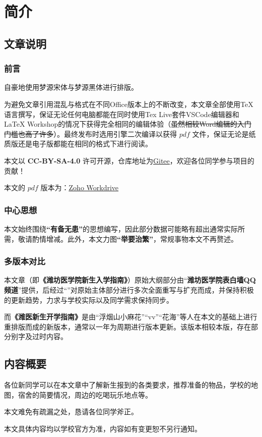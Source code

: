 \chapter[简介]{简介\vspace{-2em}}
\section[文章说明]{文章说明}
\vspace{-1em}
\subsection[前言]{前言}
\vspace{-1em}
自豪地使用梦源宋体与梦源黑体进行排版。

为避免文章引用混乱与格式在不同Office版本上的不断改变，本文章全部使用\TeX 语言撰写，保证无论任何电脑都能在同时使用Tex Live套件VSCode编辑器和LaTeX Workshop的情况下获得完全相同的编辑体验（\sout{虽然相较Word编辑的入门门槛也高了许多}）。最终发布时选用\XeLaTeX 引擎二次编译以获得 $pdf$ 文件，保证无论是纸质版还是电子版都能在相同的格式下进行阅读。

本文以 \textbf{CC-BY-SA-4.0} 许可开源，仓库地址为\uline{\href{https://gitee.com/mikazo/guide_for_freshman}{Gitee}}，欢迎各位同学参与项目的贡献！

本文的 $pdf$ 版本\textbf{}为：\uline{\href{https://workdrive.zohoexternal.com/folder/sx5ijbbd2ad4d669c4c358d59fe314410aaf4}{Zoho Workdrive}}

\subsection[中心思想]{中心思想}
\vspace{-1em}
本文始终围绕\textbf{“有备无患”}的思想编写，因此部分数据可能略有超出通常实际所需，敬请酌情增减。此外，本文力图\textbf{“举要治繁”}，常规事物本文不再赘述。

\subsection[多版本对比]{多版本对比}
\vspace{-1em}
本文章（即\textbf{《潍坊医学院新生入学指南》}）原始大纲部分由“\textbf{潍坊医学院表白墙QQ频道}”提供，后经过“\textbf{}”对原始主体部分进行多次全面重写与扩充而成，并保持积极的更新趋势，力求与学校实际以及同学需求保持同步。

而\textbf{《潍医新生开学指南》}是由“浮烟山小麻花”“vv”“花海”等人在本文的基础上进行重排版而成的新版本，通常以一年为周期进行版本更新。该版本相较本版，存在部分别字及过时内容。

\textbf{}

\section[内容概要]{内容概要}
\vspace{-1em}

各位新同学可以在本文章中了解新生报到的各类要求，推荐准备的物品，学校的地图，宿舍的简要情况，周边的吃喝玩乐地点等。

本文难免有疏漏之处，恳请各位同学斧正。

本文具体内容均以学校官方为准，内容如有变更恕不另行通知。